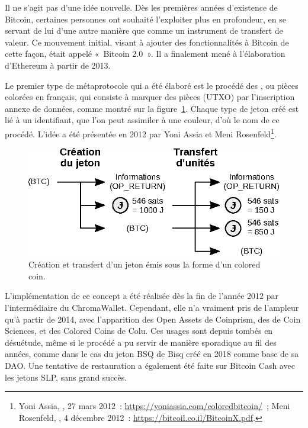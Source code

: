 Il ne s'agit pas d'une idée nouvelle. Dès les premières années d'existence de Bitcoin, certaines personnes ont souhaité l'exploiter plus en profondeur, en se servant de lui d'une autre manière que comme un instrument de transfert de valeur. Ce mouvement initial, visant à ajouter des fonctionnalités à Bitcoin de cette façon, était appelé «~Bitcoin 2.0~». Il a finalement mené à l'élaboration d'Ethereum à partir de 2013.

Le premier type de métaprotocole qui a été élaboré est le procédé des , ou pièces colorées en français, qui consiste à marquer des pièces (UTXO) par l'inscription annexe de données, comme montré sur la figure~\ref{fig:colored-coin}. Chaque type de jeton créé est lié à un identifiant, que l'on peut assimiler à une couleur, d'où le nom de ce procédé. L'idée a été présentée en 2012 par Yoni Assia et Meni Rosenfeld\footnote{Yoni Assia, , 27 mars 2012~: \url{https://yoniassia.com/coloredbitcoin/}~; Meni Rosenfeld, , 4 décembre 2012~: \url{https://bitcoil.co.il/BitcoinX.pdf}.}. %

\begin{figure}[h]
  \centering
  \includegraphics[scale=1]{img/colored-coin.eps}
  \caption{Création et transfert d'un jeton émis sous la forme d'un colored coin.}
  \label{fig:colored-coin}
\end{figure}

\vspace{-1em}
L'implémentation de ce concept a été réalisée dès la fin de l'année 2012 par l'intermédiaire du ChromaWallet. Cependant, elle n'a vraiment pris de l'ampleur qu'à partir de 2014, avec l'apparition des Open Assets de Coinprism, des  de Coin Sciences, et des Colored Coins de Colu. Ces usages sont depuis tombés en désuétude, même si le procédé a pu servir de manière sporadique au fil des années, comme dans le cas du jeton BSQ de Bisq créé en 2018 comme base de sa DAO. Une tentative de restauration a également été faite sur Bitcoin Cash avec les jetons SLP, sans grand succès. %

